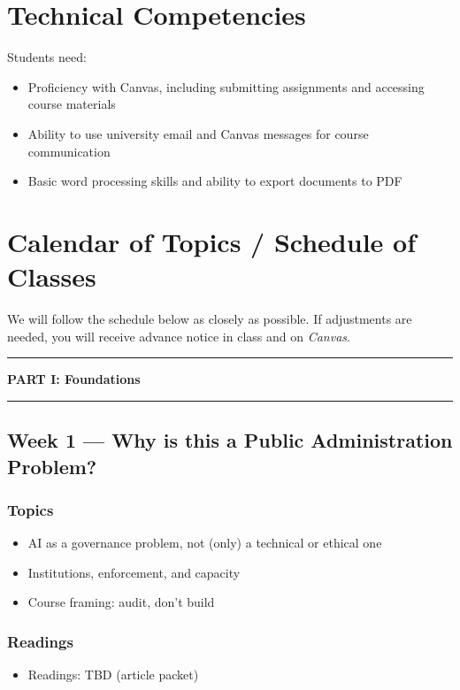 \documentclass[12pt]{article}
\begin{document}
\section*{Technical Competencies}
Students need:
\begin{itemize}
\item Proficiency with Canvas, including submitting assignments and accessing course materials
\item Ability to use university email and Canvas messages for course communication
\item Basic word processing skills and ability to export documents to PDF
\end{itemize}

\section*{Calendar of Topics / Schedule of Classes}

We will follow the schedule below as closely as possible. If adjustments are needed, you will receive advance notice in class and on \emph{Canvas}.

\bigskip

\noindent\rule{\textwidth}{0.6pt}
\begin{center}\textbf{PART I: Foundations}\end{center}
\noindent\rule{\textwidth}{0.6pt}

\subsection*{Week 1 --- Why is this a Public Administration Problem?}
    \subsubsection*{Topics}
        \begin{itemize}
            \item AI as a governance problem, not (only) a technical or ethical one
            \item Institutions, enforcement, and capacity
            \item Course framing: audit, don't build
        \end{itemize}
    \subsubsection*{Readings}
        \begin{itemize}
            \item Readings: TBD (article packet)
        \end{itemize}
\end{document}
